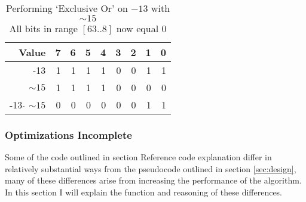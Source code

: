 \documentclass[12pt]{article}
\begin{document}
\par
\begin{table}[htpb]
	\centering
	\begin{tabular}{r|rrrrrrrr}
		\hline
		 Value     &   7 &   6 &   5 &   4 &   3 &   2 &   1 &   0 \\
		\hline
		 -13       &   1 &   1 &   1 &   1 &   0 &   0 &   1 &   1 \\
		 $\sim15$       &   1 &   1 &   1 &   1 &   0 &   0 &   0 &   0 \\
		 -13  $\hat{}$ $\sim15$ &   0 &   0 &   0 &   0 &   0 &   0 &   1 &   1 \\
		\hline
		\end{tabular}
	\caption{Performing `Exclusive Or' on $-13$ with $\sim15$ \\ All bits in range $[63 .. 8]$ now equal 0}
\end{table}


\pagebreak



\subsubsection{Optimizations {\color{red} Incomplete}}
Some of the code outlined in section {\color{red} Reference code explanation} differ in relatively substantial ways from the pseudocode outlined in section \ref{sec:design}, many of these differences arise from increasing the performance of the algorithm. In this section I will explain the function and reasoning of these differences.
\end{document}
